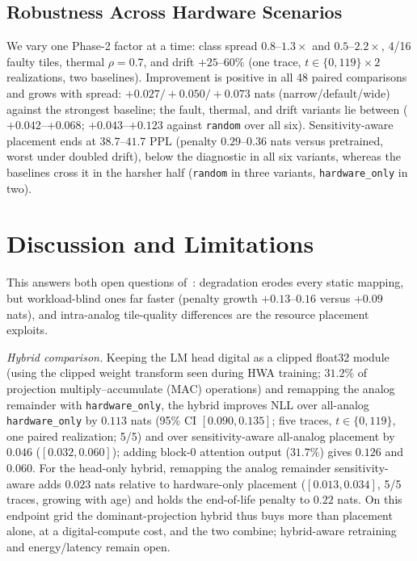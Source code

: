 \documentclass[journal]{IEEEtran}
\newcommand{\policy}[1]{\texttt{#1}}
\begin{document}
\subsection{Robustness Across Hardware Scenarios}
\label{sec:sweep}
We vary one Phase-2 factor at a time: class spread $0.8$--$1.3\times$
and $0.5$--$2.2\times$, 4/16 faulty tiles, thermal $\rho{=}0.7$, and
drift $+25$--$60\%$ (one trace, $t\!\in\!\{0,119\}\times2$
realizations, two baselines). Improvement is positive in all 48 paired
comparisons and grows with spread: $+0.027/+0.050/+0.073$ nats
(narrow/default/wide) against the strongest baseline; the fault,
thermal, and drift variants lie between ($+0.042$--$+0.068$;
$+0.043$--$+0.123$ against \policy{random} over all six).
Sensitivity-aware placement ends at $38.7$--$41.7$ PPL (penalty
$0.29$--$0.36$ nats versus pretrained, worst under doubled drift), below
the diagnostic in all six variants, whereas the baselines cross it in
the harsher half (\policy{random} in three variants,
\policy{hardware\_only} in two).

\section{Discussion and Limitations}
\label{sec:disc}
This answers both open questions of~\cite{lammie2026}: degradation
erodes every static mapping, but workload-blind ones far faster
(penalty growth $+0.13$--$0.16$ versus $+0.09$ nats), and intra-analog
tile-quality differences are the resource placement exploits.

\emph{Hybrid comparison.} Keeping the LM head digital as a clipped
float32 module (using the clipped weight transform seen during HWA
training; $31.2\%$ of projection multiply--accumulate (MAC) operations) and
remapping the analog remainder with \policy{hardware\_only}, the hybrid
improves NLL over all-analog \policy{hardware\_only} by $0.113$ nats
(95\% CI $[0.090,0.135]$; five traces, $t\!\in\!\{0,119\}$, one paired
realization; 5/5) and over sensitivity-aware all-analog placement
by $0.046$ ($[0.032,0.060]$); adding block-0 attention output
($31.7\%$) gives $0.126$ and $0.060$. For the head-only hybrid,
remapping the analog remainder sensitivity-aware adds $0.023$ nats
relative to hardware-only placement ($[0.013,0.034]$, 5/5 traces,
growing with age) and holds the end-of-life penalty to $0.22$ nats. On
this endpoint grid the dominant-projection hybrid thus buys more than
placement alone, at a digital-compute cost, and the two combine;
hybrid-aware retraining and energy/latency remain open.
\end{document}
